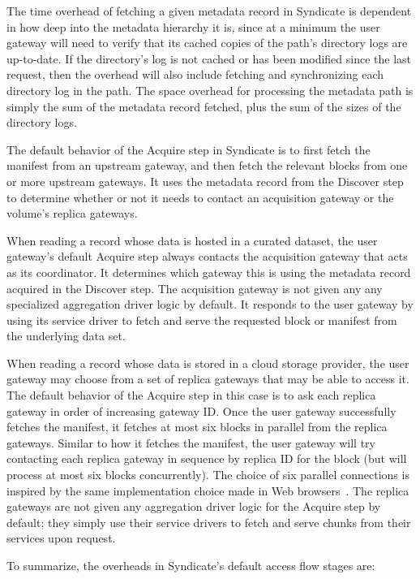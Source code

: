 The time overhead of fetching a given metadata record in Syndicate 
is dependent in how deep into the metadata
hierarchy it is, since at a minimum the user gateway will need to verify that
its cached copies of the path's directory logs are up-to-date.
If the directory's log is not cached or has been modified
since the last request, then the overhead will also include fetching and
synchronizing each directory log in the path.
The space overhead for processing the metadata path 
is simply the sum of the metadata record fetched, plus the
sum of the sizes of the directory logs.

The default behavior of the Acquire step in Syndicate is to first fetch the
manifest from an upstream gateway, and then fetch the relevant blocks from one
or more upstream gateways.  It uses the metadata record from the Discover step
to determine whether or not it needs to contact an acquisition gateway or the
volume's replica gateways.

When reading a record whose data is hosted in a curated dataset, the user
gateway's default Acquire step always contacts the acquisition gateway that
acts as its coordinator.  It determines which gateway this is using the metadata
record acquired in the Discover step.  The acquisition gateway is not given any
any specialized aggregation driver logic by default.  It responds to the user
gateway by using its service
driver to fetch and serve the requested block or manifest from the underlying
data set.

When reading a record whose data is stored in a cloud storage provider, the user
gateway may choose from a set of replica gateways that may be able to access it.
The default behavior of the Acquire step in this case is to ask each replica
gateway in order of increasing gateway ID.  Once the user gateway successfully
fetches the manifest, it fetches at most six blocks in parallel from the replica
gateways.  Similar to how it fetches the manifest, the user gateway will try
contacting each replica gateway in sequence by replica ID for the block (but
will process at most six blocks concurrently).
The choice of six parallel connections is inspired by the same implementation choice made in Web
browsers~\cite{browserscope-browsertest}.  %
The replica gateways are not given any aggregation driver logic for the Acquire
step by default; they simply use their service drivers to fetch and serve chunks
from their services upon request.

To summarize, the overheads in Syndicate's default access flow stages are:

